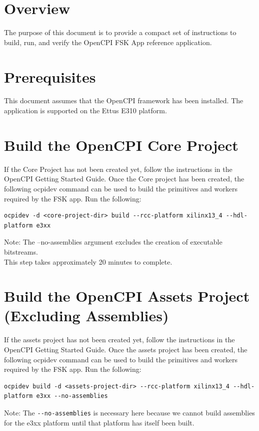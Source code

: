 \newpage
\begin{flushleft}
\section{Overview}
The purpose of this document is to provide a compact set of instructions to build, run, and verify the OpenCPI FSK App reference application.

\section{Prerequisites}
This document assumes that the OpenCPI framework has been installed. The application is supported on the Ettus E310 platform.

\section{Build the OpenCPI Core Project}
If the Core Project has not been created yet, follow the instructions in the OpenCPI Getting Started Guide. Once the Core project has been created, the following ocpidev command can be used to build the primitives and workers required by the FSK app. Run the following:
\begin{lstlisting}
ocpidev -d <core-project-dir> build --rcc-platform xilinx13_4 --hdl-platform e3xx
\end{lstlisting}

Note: The --no-assemblies argument excludes the creation of executable bitstreams.\\
This step takes approximately 20 minutes to complete.\\

\section{Build the OpenCPI Assets Project (Excluding Assemblies)}
If the assets project has not been created yet, follow the instructions in the OpenCPI Getting Started Guide. Once the assets project has been created, the following ocpidev command can be used to build the primitives and workers required by the FSK app. Run the following:
\begin{lstlisting}
ocpidev build -d <assets-project-dir> --rcc-platform xilinx13_4 --hdl-platform e3xx --no-assemblies
\end{lstlisting}
Note: The \verb|--no-assemblies| is necessary here because we cannot build assemblies for the e3xx platform until that platform has itself been built.\\


\end{flushleft}
